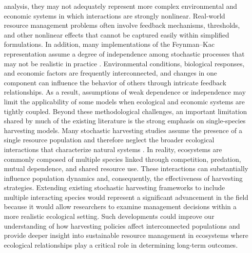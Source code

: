 \documentclass[11pt]{article}
\begin{document}
analysis, they may not adequately represent more complex environmental and economic systems in which interactions are strongly nonlinear. Real-world resource management problems often involve feedback mechanisms, thresholds, and other nonlinear effects that cannot be captured easily within simplified formulations. In addition, many implementations of the Feynman--Kac representation assume a degree of independence among stochastic processes that may not be realistic in practice \citep{pramanik2021thesis,pramanik2016}. Environmental conditions, biological responses, and economic factors are frequently interconnected, and changes in one component can influence the behavior of others through intricate feedback relationships. As a result, assumptions of weak dependence or independence may limit the applicability of some models when ecological and economic systems are tightly coupled. Beyond these methodological challenges, an important limitation shared by much of the existing literature is the strong emphasis on single-species harvesting models. Many stochastic harvesting studies assume the presence of a single resource population and therefore neglect the broader ecological interactions that characterize natural systems \citep{hua2019assessing,polansky2021motif}. In reality, ecosystems are commonly composed of multiple species linked through competition, predation, mutual dependence, and shared resource use. These interactions can substantially influence population dynamics and, consequently, the effectiveness of harvesting strategies. Extending existing stochastic harvesting frameworks to include multiple interacting species would represent a significant advancement in the field because it would allow researchers to examine management decisions within a more realistic ecological setting. Such developments could improve our understanding of how harvesting policies affect interconnected populations and provide deeper insight into sustainable resource management in ecosystems where ecological relationships play a critical role in determining long-term outcomes.
	
\end{document}
